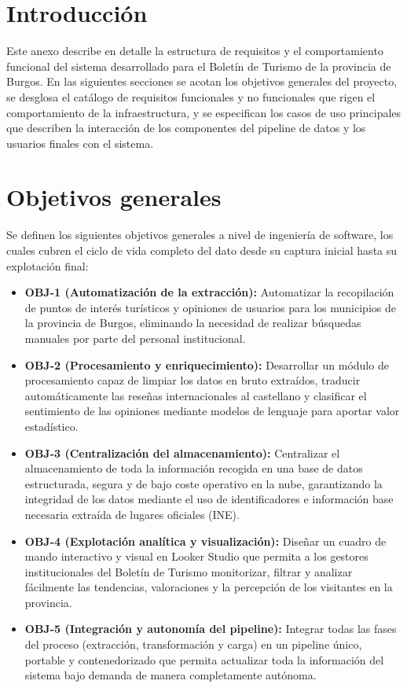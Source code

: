
\section{Introducción}
Este anexo describe en detalle la estructura de requisitos y el comportamiento funcional del sistema desarrollado para el Boletín de Turismo de la provincia de Burgos. En las siguientes secciones se acotan los objetivos generales del proyecto, se desglosa el catálogo de requisitos funcionales y no funcionales que rigen el comportamiento de la infraestructura, y se especifican los casos de uso principales que describen la interacción de los componentes del pipeline de datos y los usuarios finales con el sistema.


\section{Objetivos generales}
Se definen los siguientes objetivos generales a nivel de ingeniería de software, los cuales cubren el ciclo de vida completo del dato desde su captura inicial hasta su explotación final:

\begin{itemize}
    \item \textbf{OBJ-1 (Automatización de la extracción):} Automatizar la recopilación de puntos de interés turísticos y opiniones de usuarios para los municipios de la provincia de Burgos, eliminando la necesidad de realizar búsquedas manuales por parte del personal institucional.
    \item \textbf{OBJ-2 (Procesamiento y enriquecimiento):} Desarrollar un módulo de procesamiento capaz de limpiar los datos en bruto extraídos, traducir automáticamente las reseñas internacionales al castellano y clasificar el sentimiento de las opiniones mediante modelos de lenguaje para aportar valor estadístico.
    \item \textbf{OBJ-3 (Centralización del almacenamiento):} Centralizar el almacenamiento de toda la información recogida en una base de datos estructurada, segura y de bajo coste operativo en la nube, garantizando la integridad de los datos mediante el uso de identificadores e información base necesaria extraída de lugares oficiales (INE).
    \item \textbf{OBJ-4 (Explotación analítica y visualización):} Diseñar un cuadro de mando interactivo y visual en Looker Studio que permita a los gestores institucionales del Boletín de Turismo monitorizar, filtrar y analizar fácilmente las tendencias, valoraciones y la percepción de los visitantes en la provincia.
    \item \textbf{OBJ-5 (Integración y autonomía del pipeline):} Integrar todas las fases del proceso (extracción, transformación y carga) en un pipeline único, portable y contenedorizado que permita actualizar toda la información del sistema bajo demanda de manera completamente autónoma.
\end{itemize}



